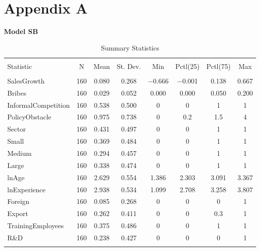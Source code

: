%
%

\chapter{Appendix A}
\label{app:app01}

\textbf{\Large Model SB}
\begin{table}[!ht] \centering 
  \caption*{Summary Statistics} 
\begin{tabular}{@{\extracolsep{5pt}}lccccccc} 
\\[-1.8ex]\hline 
\hline \\[-1.8ex] 
Statistic & \multicolumn{1}{c}{N} & \multicolumn{1}{c}{Mean} & \multicolumn{1}{c}{St. Dev.} & \multicolumn{1}{c}{Min} & \multicolumn{1}{c}{Pctl(25)} & \multicolumn{1}{c}{Pctl(75)} & \multicolumn{1}{c}{Max} \\ 
\hline \\[-1.8ex] 
SalesGrowth & 160 & 0.080 & 0.268 & $-$0.666 & $-$0.001 & 0.138 & 0.667 \\ 
Bribes & 160 & 0.029 & 0.052 & 0.000 & 0.000 & 0.050 & 0.200 \\ 
InformalCompetition & 160 & 0.538 & 0.500 & 0 & 0 & 1 & 1 \\ 
PolicyObstacle & 160 & 0.975 & 0.738 & 0 & 0.2 & 1.5 & 4 \\ 
Sector & 160 & 0.431 & 0.497 & 0 & 0 & 1 & 1 \\ 
Small & 160 & 0.369 & 0.484 & 0 & 0 & 1 & 1 \\ 
Medium & 160 & 0.294 & 0.457 & 0 & 0 & 1 & 1 \\ 
Large & 160 & 0.338 & 0.474 & 0 & 0 & 1 & 1 \\ 
lnAge & 160 & 2.629 & 0.554 & 1.386 & 2.303 & 3.091 & 3.367 \\ 
lnExperience & 160 & 2.938 & 0.534 & 1.099 & 2.708 & 3.258 & 3.807 \\ 
Foreign & 160 & 0.085 & 0.268 & 0 & 0 & 0 & 1 \\ 
Export & 160 & 0.262 & 0.411 & 0 & 0 & 0.3 & 1 \\ 
TrainingEmployees & 160 & 0.375 & 0.486 & 0 & 0 & 1 & 1 \\ 
R\&D & 160 & 0.238 & 0.427 & 0 & 0 & 0 & 1 \\ 
\hline \\[-1.8ex] 
\end{tabular} 
\end{table} 
\FloatBarrier

